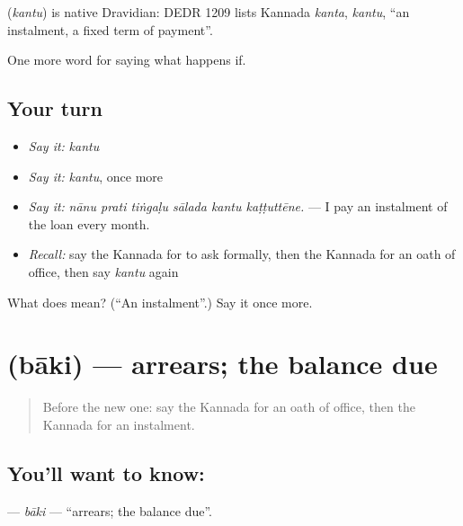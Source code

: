 \begin{cousinweb}
\textbf{} (\emph{kantu}) is native Dravidian: DEDR 1209 lists Kannada \emph{kanta}, \emph{kantu}, \textquotedblleft{}an instalment, a fixed term of payment\textquotedblright{}.
\end{cousinweb}

\begin{grammarlens}[title={What you've built}]
One more word for saying what happens if.
\end{grammarlens}

\subsection*{Your turn}
\begin{itemize}
\raggedright
  \item \emph{Say it:} \emph{kantu}
  \item \emph{Say it:} \emph{kantu}, once more
  \item \emph{Say it:} \emph{nānu prati tiṅgaḷu sālada kantu kaṭṭuttēne.} — I pay an instalment of the loan every month.
  \item \emph{Recall:} say the Kannada for to ask formally, then the Kannada for an oath of office, then say \emph{kantu} again
\end{itemize}

\begin{tcolorbox}[breakable,colback=teal!4,colframe=teal!35!black,title={Before you move on}]
What does  mean? (\textquotedblleft{}An instalment\textquotedblright{}.) Say it once more.
\end{tcolorbox}
\section[\texorpdfstring{\kn{ಬಾಕಿ} (bāki)}{ಬಾಕಿ (bāki)}]{ (bāki) — arrears; the balance due}

\label{lesson:KA-C417-baki}



\begin{quote}
Before the new one: say the Kannada for an oath of office, then the Kannada for an instalment.
\end{quote}

\subsection*{You'll want to know: }
\textbf{} — \emph{bāki} — \textquotedblleft{}arrears; the balance due\textquotedblright{}.

